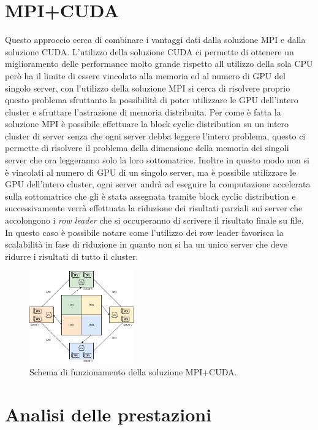 \documentclass[conference]{IEEEtran}
\begin{document}
\section{MPI+CUDA}
Questo approccio cerca di combinare i vantaggi dati dalla soluzione MPI e dalla soluzione CUDA. L'utilizzo della soluzione CUDA ci permette di ottenere un miglioramento delle performance molto grande rispetto all utilizzo della sola CPU però ha il limite di essere vincolato alla memoria ed al numero di GPU del singolo server, con l'utilizzo della soluzione MPI si cerca di risolvere proprio questo problema sfruttanto la possibilità di poter utilizzare le GPU dell'intero cluster e sfruttare l'astrazione di memoria distribuita. Per come è fatta la soluzione MPI è possibile effettuare la block cyclic distribution su un intero cluster di server senza che ogni server debba leggere l'intero problema, questo ci permette di risolvere il problema della dimensione della memoria dei singoli server che ora leggeranno solo la loro sottomatrice. Inoltre in questo modo non si è vincolati al numero di GPU di un singolo server, ma è possibile utilizzare le GPU dell'intero cluster, ogni server andrà ad eseguire la computazione accelerata sulla sottomatrice che gli è stata assegnata tramite block cyclic distribution e successivamente verrà effettuata la riduzione dei risultati parziali sui server che accolongono i \textit{row leader} che si occuperanno di scrivere il risultato finale su file. In questo caso è possibile notare come l'utilizzo dei row leader favorisca la scalabilità in fase di riduzione in quanto non si ha un unico server che deve ridurre i risultati di tutto il cluster.
\begin{figure}[H]
    \centering
    \includegraphics[width=0.4\textwidth]{resources/mpi_cuda_adjusted.png}
    \caption{Schema di funzionamento della soluzione MPI+CUDA.}
    \label{fig:mpi_cuda_scheme}
\end{figure}

\section{Analisi delle prestazioni}
\end{document}
